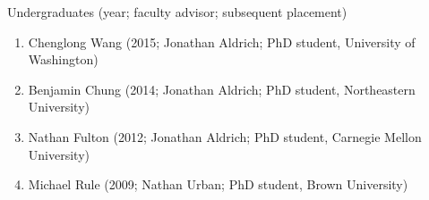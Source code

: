 \documentclass[10pt,letterpaper]{article}
\renewenvironment{itemize}{
  \begin{list}{}{
    \setlength{\leftmargin}{1.25em}
    \setlength{\itemsep}{0.25em}
    \setlength{\parskip}{0pt}
    \setlength{\parsep}{0.2em}
  }
}{
  \end{list}
}
\begin{document}
\begin{itemize}
  \item Undergraduates (year; faculty advisor; subsequent placement)
        \begin{enumerate}
          \item Chenglong Wang (2015; Jonathan Aldrich; PhD student, University of Washington)
          \item Benjamin Chung (2014; Jonathan Aldrich; PhD student, Northeastern University)
          \item Nathan Fulton (2012; Jonathan Aldrich; PhD student, Carnegie Mellon University)
          \item Michael Rule (2009; Nathan Urban; PhD student, Brown University)
        \end{enumerate}
\end{itemize}
\end{document}
